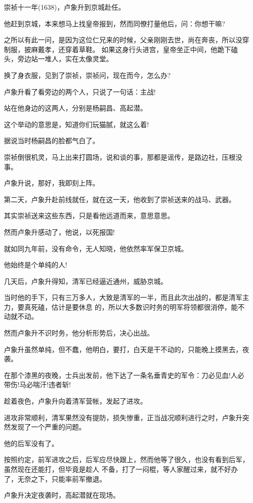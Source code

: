 \documentclass[11pt,a4paper,onecolumn]{article}
\begin{document}
崇祯十一年(1638)，卢象升到京城赴任。

他赶到京城，本来想马上找皇帝报到，然而同僚打量他后，问：你想干嘛?

之所以有此一问，是因为这位仁兄来的时候，父亲刚刚去世，尚在奔丧，所以没穿制服，披麻戴孝，还穿着草鞋。
如果这身行头进宫，皇帝坐正中间，他跪下磕头，旁边站一堆人，实在太像灵堂。

换了身衣服，见到了崇祯，崇祯问，现在而今，怎么办?

卢象升看了看旁边的两个人，只说了一句话：主战!

站在他身边的这两人，分别是杨嗣昌、高起潜。

这个举动的意思是，知道你们玩猫腻，就这么着!

据说当时杨嗣昌的脸都气白了。

崇祯倒很机灵，马上出来打圆场，说和谈的事，那都是谣传，是路边社，压根没事。

卢象升说，那好，我即刻上阵。

第二天，卢象升赴前线就任，就在这一天，他收到了崇祯送来的战马、武器。

其实崇祯送来这些东西，只是看他远道而来，意思意思。

然而卢象升感动了，他说，以死报国!

就如同九年前，没有命令，无人知晓，他依然率军保卫京城。

他始终是个单纯的人!

几天后，卢象升得知，清军已经逼近通州，威胁京城。

当时他的手下，只有三万多人，大致是清军的一半，而且此次出战的，都是清军主力，要真死磕，估计是要休息
的，所以大多数识时务的明军将领都很消停，能不动就不动。

然而卢象升不识时务，他分析形势后，决心出战。

卢象升虽然单纯，但不蠢，他明白，要打，白天是干不动的，只能晚上摸黑去，夜袭。

在那个漆黑的夜晚，士兵出发前，他下达了一条名垂青史的军令：刀必见血!人必带伤!马必喘汗!违者斩!

趁着夜色，卢象升向着清军营帐，发起了进攻。

进攻非常顺利，清军果然没有提防，损失惨重，正当战况顺利进行之时，卢象升突然发现了一个严重的问题。

他的后军没有了。

按照约定，前军进攻之后，后军应尽快跟上，然而他等了很久，也没有看到后军，虽然现在还能打，但毕竟是趁人
不备，打了一闷棍，等人家醒过来，就不好办了，无奈之下，只能率前军撤退。

卢象升决定夜袭时，高起潜就在现场。
\end{document}
